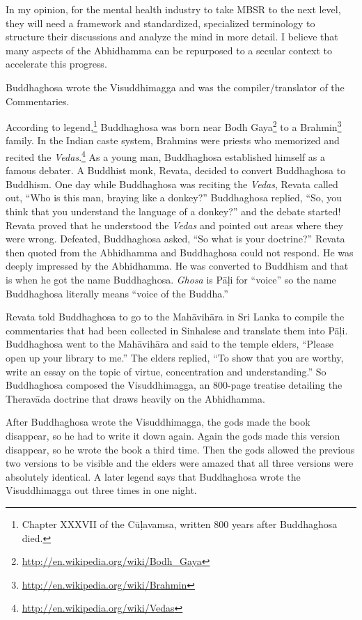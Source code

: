 In my opinion, for the mental health industry to take MBSR to the next level, they will need a framework and standardized, specialized terminology to structure their discussions and analyze the mind in more detail. I believe that many aspects of the Abhidhamma can be repurposed to a secular context to accelerate this progress.

\pagebreak


Buddhaghosa wrote the Visuddhimagga and was the compiler/translator of the Commentaries.

According to legend,\footnote{Chapter XXXVII of the Cūḷavamsa, written 800 years after Buddhaghosa died.} Buddhaghosa was born near Bodh Gaya\footnote{\url{http://en.wikipedia.org/wiki/Bodh_Gaya}} to a Brahmin\footnote{\url{http://en.wikipedia.org/wiki/Brahmin}} family. In the Indian caste system, Brahmins were priests who memorized and recited the \textit{Vedas}.\footnote{\url{http://en.wikipedia.org/wiki/Vedas}} As a young man, Buddhaghosa established himself as a famous debater. A Buddhist monk, Revata, decided to convert Buddhaghosa to Buddhism. One day while Buddhaghosa was reciting the \textit{Vedas}, Revata called out, “Who is this man, braying like a donkey?” Buddhaghosa replied, “So, you think that you understand the language of a donkey?” and the debate started! Revata proved that he understood the \textit{Vedas} and pointed out areas where they were wrong. Defeated, Buddhaghosa asked, “So what is your doctrine?” Revata then quoted from the Abhidhamma and Buddhaghosa could not respond. He was deeply impressed by the Abhidhamma. He was converted to Buddhism and that is when he got the name Buddhaghosa. \textit{Ghosa} is Pāḷi for “voice” so the name Buddhaghosa literally means “voice of the Buddha.”

Revata told Buddhaghosa to go to the Mahāvihāra in Sri Lanka to compile the commentaries that had been collected in Sinhalese and translate them into Pāḷi. Buddhaghosa went to the Mahāvihāra and said to the temple elders, “Please open up your library to me.” The elders replied, “To show that you are worthy, write an essay on the topic of virtue, concentration and understanding.” So Buddhaghosa composed the Visuddhimagga, an 800-page treatise detailing the Theravāda doctrine that draws heavily on the Abhidhamma.

After Buddhaghosa wrote the Visuddhimagga, the gods made the book disappear, so he had to write it down again. Again the gods made this version disappear, so he wrote the book a third time. Then the gods allowed the previous two versions to be visible and the elders were amazed that all three versions were absolutely identical. A later legend says that Buddhaghosa wrote the Visuddhimagga out three times in one night. 

